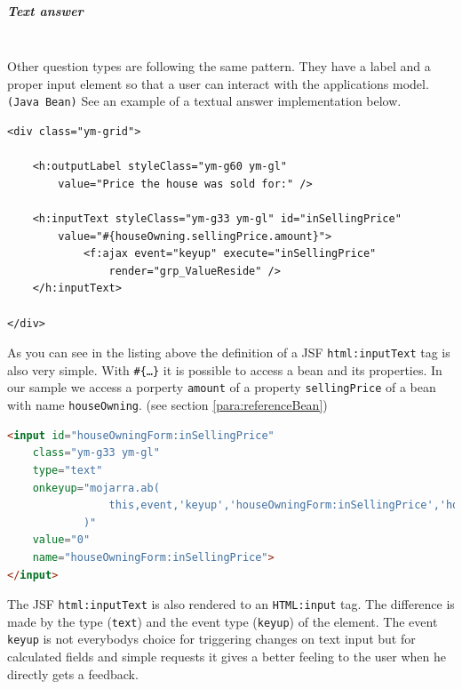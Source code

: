 \subparagraph{Text answer}
$\;$ \\Other question types are following the same pattern. They have a label
and a proper input element so that a user can interact with the applications model.
\texttt{(Java Bean)} See an example of a textual answer implementation below.

\begin{lstlisting}[language=XHTML]
<div class="ym-grid">

	<h:outputLabel styleClass="ym-g60 ym-gl"
		value="Price the house was sold for:" />

	<h:inputText styleClass="ym-g33 ym-gl" id="inSellingPrice"
		value="#{houseOwning.sellingPrice.amount}">
			<f:ajax event="keyup" execute="inSellingPrice"
				render="grp_ValueReside" />
	</h:inputText>

</div>
\end{lstlisting}

As you can see in the listing above the definition of a JSF
\texttt{html:inputText} tag is also very simple. With \texttt{\#\{\ldots\}} it
is possible to access a bean and its properties. In our sample we access a
porperty \texttt{amount} of a property \texttt{sellingPrice} of a bean with
name \texttt{houseOwning}. (see section \ref{para:referenceBean})

\begin{lstlisting}[language=HTML]
<input id="houseOwningForm:inSellingPrice" 
	class="ym-g33 ym-gl" 
	type="text"
	onkeyup="mojarra.ab(
				this,event,'keyup','houseOwningForm:inSellingPrice','houseOwningForm:grp_ValueReside'
			)"
	value="0" 
	name="houseOwningForm:inSellingPrice">
</input>
\end{lstlisting}

The JSF \texttt{html:inputText} is also rendered to an \texttt{HTML:input} tag.
The difference is made by the type (\texttt{text}) and the event type
(\texttt{keyup}) of the element. The event \texttt{keyup} is not everybodys
choice for triggering changes on text input but for calculated fields and simple requests
it gives a better feeling to the user when he directly gets a feedback.

\begin{center}
\end{center}

